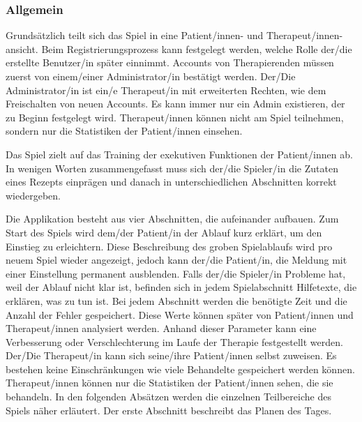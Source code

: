 \subsubsection{Allgemein}

Grundsätzlich teilt sich das Spiel in eine Patient/innen- und Therapeut/innen-ansicht. Beim Registrierungsprozess kann festgelegt werden, welche Rolle der/die erstellte Benutzer/in später einnimmt. Accounts von Therapierenden müssen zuerst von einem/einer Administrator/in bestätigt werden. Der/Die Administrator/in ist ein/e Therapeut/in mit erweiterten Rechten, wie dem Freischalten von neuen Accounts. Es kann immer nur ein Admin existieren, der zu Beginn festgelegt wird. Therapeut/innen können nicht am Spiel teilnehmen, sondern nur die Statistiken der Patient/innen einsehen.

Das Spiel zielt auf das Training der exekutiven Funktionen der Patient/innen ab. In wenigen Worten zusammengefasst muss sich der/die Spieler/in die Zutaten eines Rezepts einprägen und danach in unterschiedlichen Abschnitten korrekt wiedergeben.

Die Applikation besteht aus vier Abschnitten, die aufeinander aufbauen. Zum Start des Spiels wird dem/der Patient/in der Ablauf kurz erklärt, um den Einstieg zu erleichtern. Diese Beschreibung des groben Spielablaufs wird pro neuem Spiel wieder angezeigt, jedoch kann der/die Patient/in, die Meldung mit einer Einstellung permanent ausblenden. Falls der/die Spieler/in Probleme hat, weil der Ablauf nicht klar ist, befinden sich in jedem Spielabschnitt Hilfetexte, die erklären, was zu tun ist. Bei jedem Abschnitt werden die benötigte Zeit und die Anzahl der Fehler gespeichert. Diese Werte können später von Patient/innen und Therapeut/innen analysiert werden. Anhand dieser Parameter kann eine Verbesserung oder Verschlechterung im Laufe der Therapie festgestellt werden. Der/Die Therapeut/in kann sich seine/ihre Patient/innen selbst zuweisen. Es bestehen keine Einschränkungen wie viele Behandelte gespeichert werden können. Therapeut/innen können nur die Statistiken der Patient/innen sehen, die sie behandeln. In den folgenden Absätzen werden die einzelnen Teilbereiche des Spiels näher erläutert. Der erste Abschnitt beschreibt das Planen des Tages.


